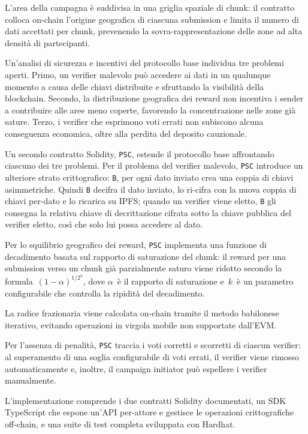 L'area della campagna è suddivisa in una griglia spaziale di chunk:
il contratto colloca on-chain l'origine geografica di ciascuna
submission e limita il numero di dati accettati per chunk,
prevenendo la sovra-rappresentazione delle zone ad alta densità di
partecipanti.

Un'analisi di sicurezza e incentivi del protocollo base individua
tre problemi aperti.
Primo, un verifier malevolo può accedere ai dati in un qualunque momento a causa delle chiavi distribuite e sfruttando la visibilità della blockchain.
Secondo, la distribuzione geografica dei reward non incentiva i
sender a contribuire alle aree meno coperte, favorendo la
concentrazione nelle zone già sature.
Terzo, i verifier che esprimono voti errati non subiscono alcuna
conseguenza economica, oltre alla perdita del deposito cauzionale.

Un secondo contratto Solidity, \texttt{PSC}, estende il protocollo base
affrontando ciascuno dei tre problemi.
Per il problema del verifier malevolo, \texttt{PSC} introduce un ulteriore
strato crittografico: \texttt{B}, per ogni dato inviato crea una coppia di chiavi asimmetriche.
Quindi \texttt{B} decifra il dato inviato, lo ri-cifra con la nuova coppia di chiavi per-dato e lo ricarica su IPFS;
quando un verifier viene eletto, \texttt{B} gli consegna la relativa chiave di decrittazione cifrata sotto la chiave pubblica del verifier eletto,
così che solo lui possa accedere al dato.

Per lo squilibrio geografico dei reward, \texttt{PSC} implementa una funzione
di decadimento basata sul rapporto di saturazione del chunk: il
reward per una submission verso un chunk già parzialmente saturo
viene ridotto secondo la formula~$(1 - \alpha)^{1/2^k}$, dove
$\alpha$~è il rapporto di saturazione e~$k$~è un parametro
configurabile che controlla la ripidità del decadimento.

La radice frazionaria viene calcolata on-chain tramite il metodo
babilonese iterativo, evitando operazioni in virgola mobile non
supportate dall'EVM.

Per l'assenza di penalità, \texttt{PSC} traccia i voti corretti e scorretti di ciascun verifier:
al superamento di una soglia configurabile di voti errati, il verifier viene rimosso automaticamente e,
inoltre, il campaign initiator può espellere i verifier manualmente.

L'implementazione comprende i due contratti Solidity documentati,
un SDK TypeScript che espone un'API per-attore e gestisce le
operazioni crittografiche off-chain, e una suite di test completa
sviluppata con Hardhat.

